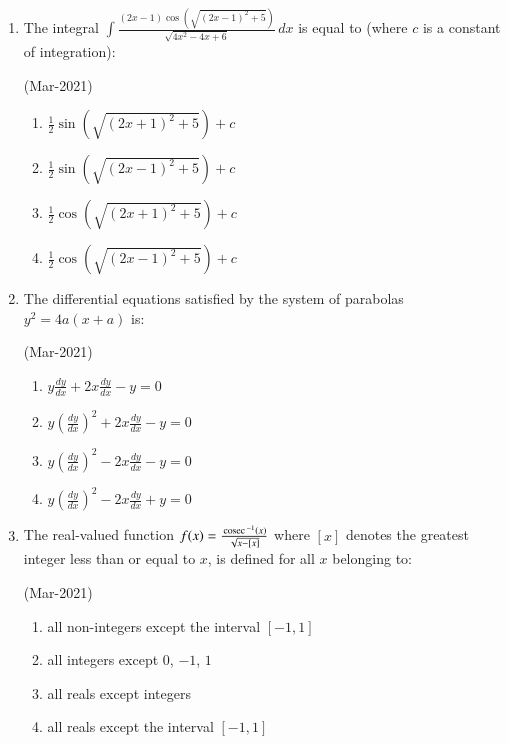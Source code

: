 \documentclass[journal,12pt,onecolumn]{IEEEtran}
\theoremstyle{remark}
\begin{document}
\begin{enumerate}
			\hfill{(Mar-2021)}
		\begin{enumerate}
    \item $ 3 + 2\sqrt{3} $
    \item $ 4 + \sqrt{3} $
    \item $ 2 + \sqrt{3} $
    \item $ 1.5 + \sqrt{3} $
                \end{enumerate}
	\item
		The integral $
\int \frac{(2x - 1) \cos\left(\sqrt{(2x - 1)^2 + 5}\right)}{\sqrt{4x^2 - 4x + 6}} \, dx $ is equal to (where \( c \) is a constant of integration):

	\hfill{(Mar-2021)}
               \begin{enumerate}
    \item $ \frac{1}{2} \sin\left(\sqrt{(2x + 1)^2 + 5}\right) + c $
    \item $ \frac{1}{2} \sin\left(\sqrt{(2x - 1)^2 + 5}\right) + c $
    \item $ \frac{1}{2} \cos\left(\sqrt{(2x + 1)^2 + 5}\right) + c $
    \item $ \frac{1}{2} \cos\left(\sqrt{(2x - 1)^2 + 5}\right) + c $
               \end{enumerate}
       \item
	       The differential equations satisfied by the system of parabolas $ y^2 = 4a(x + a)$ is:

	       	\hfill{(Mar-2021)}
	       \begin{enumerate}
    \item $ y \frac{dy}{dx} + 2x \frac{dy}{dx} - y = 0 $
    \item $ y \left(\frac{dy}{dx}\right)^2 + 2x \frac{dy}{dx} - y = 0 $
    \item $ y \left(\frac{dy}{dx}\right)^2 - 2x \frac{dy}{dx} - y = 0 $
    \item $ y \left(\frac{dy}{dx}\right)^2 - 2x \frac{dy}{dx} + y = 0 $
               \end{enumerate}
       \item
	       The real-valued function $ f(x) = \frac{\,\text{cosec}\,^{-1}(x)}{\sqrt{x - [x]}}$ where $[x]$ denotes the greatest integer less than or equal to $x$, is defined for all $x$ belonging to:

	       	\hfill{(Mar-2021)}
	       \begin{enumerate}
    \item all non-integers except the interval $[-1, 1]$
    \item all integers except $0$, $-1$, $1$
    \item all reals except integers
    \item all reals except the interval $[-1, 1]$
               \end{enumerate}
       














\end{enumerate}
\end{document}
